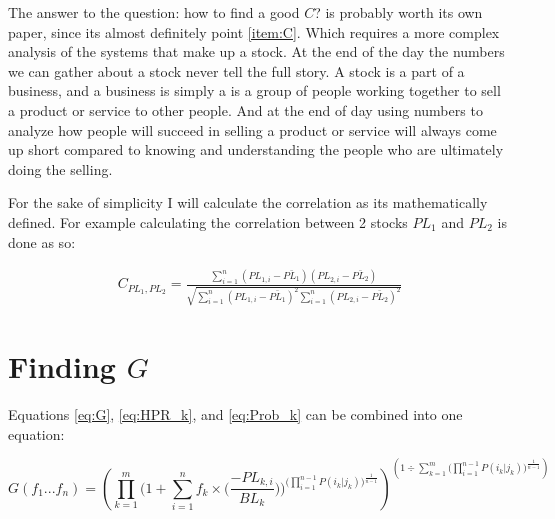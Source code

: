 \documentclass[12pt]{article}
\begin{document}
    The answer to the question: how to find a good \(C\)? is probably worth its own paper, since
    its almost definitely point \ref{item:C}. Which requires a more complex analysis of the systems
    that make up a stock. At the end of the day the numbers we can gather about a stock never
    tell the full story. A stock is a part of a business, and a business is simply a is a
    group of people working together to sell a product or service to other people.
    And at the end of day using numbers to analyze how people will succeed in selling
    a product or service will always come up short compared to knowing and understanding
    the people who are ultimately doing the selling.

    For the sake of simplicity I will calculate the correlation as its mathematically defined.
    For example calculating the correlation between 2 stocks \(PL_1\) and \(PL_2\) is
    done as so:

    \begin{align}
        C_{PL_1, PL_2} = 
        \frac{
            \displaystyle\sum^{n}_{i=1} (PL_{1, i} - \bar {PL_1})(PL_{2, i} - \bar {PL_2})
        }{
            \sqrt{
                \displaystyle\sum^{n}_{i=1}(PL_{1,i} - \bar {PL_1})^2 
                \displaystyle\sum^{n}_{i=1}(PL_{2,i} - \bar {PL_2})^2
            }
        }
        \label{eq:Correlation}
    \end{align}

\section{Finding \(G\)}

    Equations \ref{eq:G}, \ref{eq:HPR_k}, and \ref{eq:Prob_k} can be combined into one equation:

    \begin{equation}\label{eq:FullG}
        G(f_1...f_n) = \left(
            \displaystyle\prod^{m}_{k=1} \Bigg(
                1 + \displaystyle\sum^{n}_{i=1} f_k \times \Big(
                    \frac{- PL_{k,i} }{BL_k}
                \Big) 
            \Bigg)^{\Bigg(
                \displaystyle\prod^{n - 1}_{i=1} P(i_k | j_k)
            \Bigg) ^ {\frac{1}{n - 1}}} 
        \right) ^ {
            \left( {1 \div {\displaystyle\sum^{m}_{k=1}
                \Bigg( 
                    \displaystyle\prod^{n - 1}_{i=1}  P(i_k | j_k)
                \Bigg) ^ {
                    \frac{1}{n - 1}}
                }
            }
        \right)}
    \end{equation}
\end{document}
